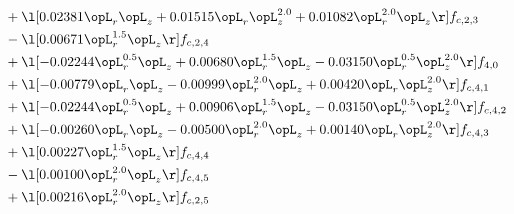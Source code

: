 \begin{alignat}{2}
& + \l[  0.02381 \opL_r \opL_z +  0.01515 \opL_r \opL_z^{2.0} +  0.01082 \opL_r^{2.0} \opL_z  \r] f_{c,2,3} \nonumber \\ 
& - \l[  0.00671 \opL_r^{1.5} \opL_z  \r] f_{c,2,4} \nonumber \\ 
& + \l[  -0.02244 \opL_r^{0.5} \opL_z +  0.00680 \opL_r^{1.5} \opL_z   -0.03150 \opL_r^{0.5} \opL_z^{2.0}  \r] f_{4,0} \nonumber \\ 
& + \l[  -0.00779 \opL_r \opL_z   -0.00999 \opL_r^{2.0} \opL_z +  0.00420 \opL_r \opL_z^{2.0}  \r] f_{c,4,1} \nonumber \\ 
& + \l[  -0.02244 \opL_r^{0.5} \opL_z +  0.00906 \opL_r^{1.5} \opL_z   -0.03150 \opL_r^{0.5} \opL_z^{2.0}  \r] f_{c,4,2} \nonumber \\ 
& + \l[  -0.00260 \opL_r \opL_z   -0.00500 \opL_r^{2.0} \opL_z +  0.00140 \opL_r \opL_z^{2.0}  \r] f_{c,4,3} \nonumber \\ 
& + \l[  0.00227 \opL_r^{1.5} \opL_z  \r] f_{c,4,4} \nonumber \\ 
& - \l[  0.00100 \opL_r^{2.0} \opL_z  \r] f_{c,4,5} \nonumber \\ 
& + \l[  0.00216 \opL_r^{2.0} \opL_z  \r] f_{c,2,5} \nonumber \\ 
\end{alignat} 


